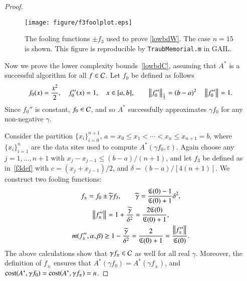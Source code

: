\documentclass[review]{elsarticle}
\newcommand{\abstol}{\varepsilon}
\theoremstyle{definition}
\newcommand{\tgamma}{\widetilde{\gamma}}
\begin{document}
\begin{proof}
	\begin{figure}
		\centering
		\texttt{[image: figure/f3foolplot.eps]}
		\caption{The fooling functions $\pm f_3$ used to prove \eqref{lowbdW}. The case
		$n=15$ is shown.  This figure is reproducible by \texttt{TraubMemorial.m}
		in GAIL.}
		\label{f3foolplot}
	\end{figure}
	
	Now we prove the lower complexity bounds~\eqref{lowbdC}, assuming that $A^*$ is
	a successful algorithm for all $f \in \mathcal{C}$. Let $f_0$ be defined as follows
	\begin{equation}
	\label{assumpfzero}
	f_0(x) =\frac{x^2}{2}, \quad f_0''(x) = 1, \quad x \in [a,b], \qquad \norm[\frac12]{f_0''} = (b -a)^2  \quad \norm{f_0''} = 1.
	\end{equation}
	Since $f_0''$ is constant, $f_0 \in \mathcal{C}$, and so $A^*$ successfully approximates
	$\gamma f_0$ for any non-negative $\gamma$.
	
	Consider the partition $\{x_i\}_{i=0}^{n+1}$, $a=x_0 \le x_1 < \cdots < x_n \le
	x_{n+1} = b$, where $\{x_i\}_{i=1}^n$ are the data sites used to compute
	$A^*(\gamma f_0,\abstol)$. Again choose any $j=1, \ldots, n+1$ with $x_j-x_{j-1}
	\le (b-a)/(n+1)$, and let $f_3$ be defined as in~\eqref{f3def} with $c =
	(x_j+x_{j-1})/2$, and $\delta = (b-a)/[4(n+1)]$. We construct two fooling
	functions:
	\begin{gather*}
	f_{\pm} = f_0 \pm \tgamma f_3, \qquad \tgamma =\frac{\fC(0)-1}{\fC(0)+1}\delta^2, \\
	\norm{f''_{\pm}} = 1+\frac{\tgamma}{\delta^2} = \frac{2\fC(0)}{\fC(0)+1} , \\
	m(f''_{\pm},\alpha,\beta) \ge 1-\frac{\tgamma}{\delta^2} = \frac{2}{\fC(0)+1} = \frac{\norm{f''_{\pm}} }{\fC(0)}.
	\end{gather*}
	The above calculations show that $\gamma f_{\pm} \in \mathcal{C}$ as well for all real
	$\gamma$. Moreover, the definition of $f_{\pm}$ ensures that $A^*(\gamma f_0) =
	A^*(\gamma f_{\pm})$, and $\operatorname{cost}(A^*,\gamma f_0) = \operatorname{cost}(A^*,\gamma f_{\pm}) =
	n$.
	

\end{proof}
\end{document}
